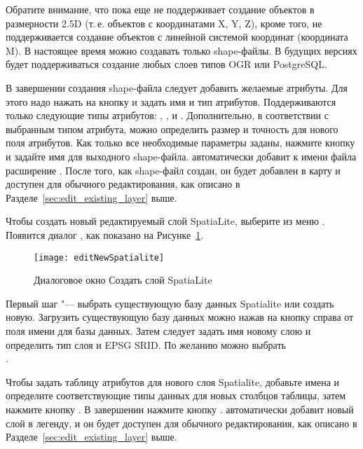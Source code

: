 Обратите внимание, что \qg пока еще не поддерживает создание объектов в
размерности 2.5D (т.\,е. объектов с координатами X, Y, Z), кроме того, не
поддерживается создание объектов с линейной системой координат (координата M).
В настоящее время можно создавать только shape-файлы. В будущих
версиях \qg будет поддерживаться создание любых слоев типов OGR или PostgreSQL.

В завершении создания shape-файла следует добавить желаемые атрибуты. Для
этого надо нажать на кнопку   и задать имя и тип атрибутов.
Поддерживаются только следующие типы атрибутов:  ,
, и .
Дополнительно, в соответствии с выбранным типом атрибута, можно определить
размер и точность для нового поля атрибутов. Как только все необходимые
параметры заданы, нажмите кнопку  и задайте имя для выходного
shape-файла. \qg автоматически добавит к имени файла расширение .
После того, как shape-файл создан, он будет добавлен в карту и доступен для
обычного редактирования, как описано в Разделе~\ref{sec:edit_existing_layer} выше.

\label{sec:create spatialite}

Чтобы создать новый редактируемый слой SpatiaLite, выберите 
\arrow {} из меню
. Появится диалог , как
показано на Рисунке~\ref{fig:newspatialitelayer}.

\begin{figure}[ht]
   \centering
   \texttt{[image: editNewSpatialite]}
   \caption{Диалоговое окно Создать слой SpatiaLite \nixcaption}\label{fig:newspatialitelayer}
\end{figure}

Первый шаг "--- выбрать существующую базу данных Spatialite или создать
новую. Загрузить существующую базу данных можно нажав на кнопку 
справа от поля имени для базы данных. Затем следует задать имя новому слою и
определить тип слоя и EPSG SRID. По желанию можно выбрать \\
.

Чтобы задать таблицу атрибутов для нового слоя Spatialite, добавьте имена
и определите соответствующие типы данных для новых столбцов таблицы, затем
нажмите кнопку . В завершении нажмите кнопку .
\qg автоматически добавит новый слой в легенду, и он будет доступен для
обычного редактирования, как описано в Разделе~\ref{sec:edit_existing_layer} выше.

